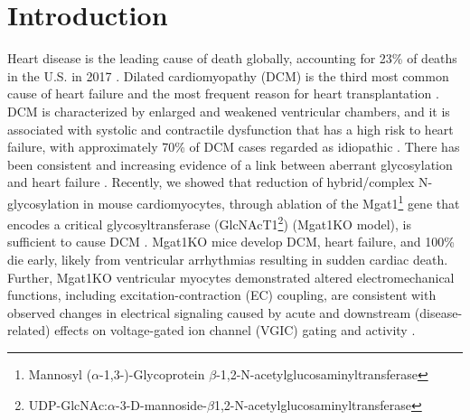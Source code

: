 \documentclass[10pt,letterpaper]{article}
\begin{document}
\linenumbers

\section*{Introduction}
Heart disease is the leading cause of death globally, accounting for 23\% of deaths in the U.S. in 2017 \cite{cdc2019deaths}. Dilated cardiomyopathy (DCM) is the third most common cause of heart failure and the most frequent reason for heart transplantation \cite{weintraub2017dilated}. DCM is characterized by enlarged and weakened ventricular chambers, and it is associated with systolic and contractile dysfunction that has a high risk to heart failure, with approximately 70\% of DCM cases regarded as idiopathic \cite{weintraub2017dilated, lakdawala2013dilated, hershberger2011update}. There has been consistent and increasing evidence of a link between aberrant glycosylation and heart failure \cite{gehrmann2003cardiomyopathy, footitt2009cardiomyopathy, marques2017cardiac}. Recently, we showed that reduction of hybrid/complex N-glycosylation in mouse cardiomyocytes, through ablation of the Mgat1\footnote{Mannosyl ($\alpha$-1,3-)-Glycoprotein $\beta$-1,2-N-acetylglucosaminyltransferase} gene that encodes a critical glycosyltransferase (GlcNAcT1\footnote{UDP-GlcNAc:$\alpha$-3-D-mannoside-$\beta$1,2-N-acetylglucosaminyltransferase}) (Mgat1KO model), is sufficient to cause DCM \cite{ednie2019reduced, ednie2019reduced2}. Mgat1KO mice develop DCM, heart failure, and 100\% die early, likely from ventricular arrhythmias resulting in sudden cardiac death. Further, Mgat1KO ventricular myocytes demonstrated altered electromechanical functions, including excitation-contraction (EC) coupling, are consistent with observed changes in electrical signaling caused by acute and downstream (disease-related) effects on voltage-gated ion channel (VGIC) gating and activity \cite{ednie2019reduced}. 
\end{document}
